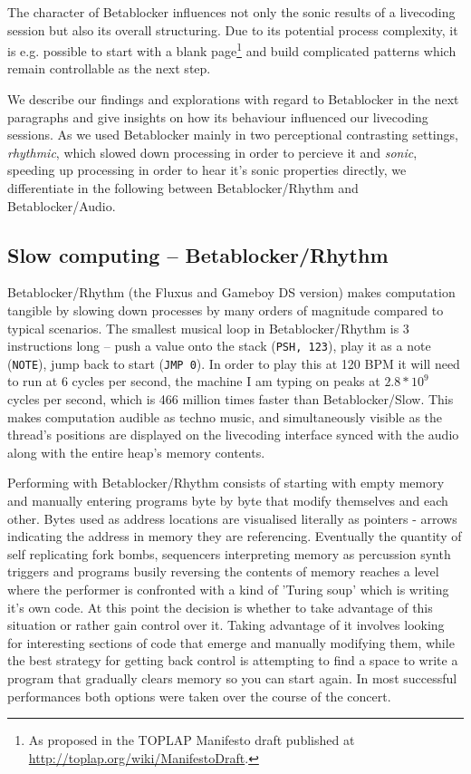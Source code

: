 \documentclass[letterpaper, 12pt]{article}
\begin{document}
The character of Betablocker influences not only the sonic results of a livecoding session but also its overall structuring.
Due to its potential process complexity, it is e.g. possible to start with a blank page\footnote{As proposed in the TOPLAP Manifesto draft published at \url{http://toplap.org/wiki/ManifestoDraft}.}
and build complicated patterns which remain controllable as the next step.

We describe our findings and explorations with regard to Betablocker in the next paragraphs and give insights on how its behaviour influenced our livecoding sessions.
As we used Betablocker mainly in two perceptional contrasting settings, \emph{rhythmic}, which slowed down processing in order to percieve it and \emph{sonic}, speeding up processing in order to hear it's sonic properties directly, we differentiate in the following between Betablocker/Rhythm and Betablocker/Audio.

\subsection{Slow computing -- Betablocker/Rhythm}
\label{sub:slow_computing}


Betablocker/Rhythm (the Fluxus and Gameboy DS version) makes computation tangible by slowing down processes by many orders of magnitude compared to typical scenarios. 
The smallest musical loop in Betablocker/Rhythm is 3 instructions long -- push a value onto the stack (\texttt{PSH, 123}), play it as a note (\texttt{NOTE}), jump back to start (\texttt{JMP 0}). 
In order to play this at 120 BPM it will need to run at 6 cycles per second, the machine I am typing on peaks at $2.8*10^9$ cycles per second, which is 466 million times faster than Betablocker/Slow. This makes computation audible as techno music, and simultaneously visible as the thread's positions are displayed on the livecoding interface synced with the audio along with the entire heap's memory contents.

Performing with Betablocker/Rhythm consists of starting with empty memory and manually entering programs byte by byte that modify themselves and each other. Bytes used as address locations are visualised literally as pointers - arrows indicating the address in memory they are referencing. 
Eventually the quantity of self replicating fork bombs, sequencers interpreting memory as percussion synth triggers and programs busily reversing the contents of memory reaches a level where the performer is confronted with a kind of 'Turing soup' which is writing it's own code. 
At this point the decision is whether to take advantage of this situation or rather gain control over it.
Taking advantage of it involves looking for interesting sections of code that emerge and manually modifying them, while the best strategy for getting back control is attempting to find a space to write a program that gradually clears memory so you can start again. 
In most successful performances both options were taken over the course of the concert.
\end{document}
